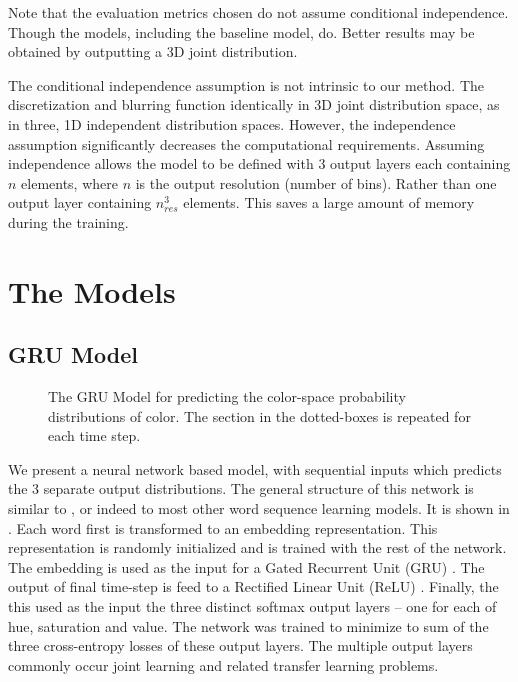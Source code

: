 \documentclass[11pt,letterpaper]{article}
\newcommand{\parencite}{\cite}
\newcommand{\textcite}{\newcite}
\begin{document}
Note that the evaluation metrics chosen do not assume conditional independence.
Though the models, including the baseline model, do.
Better results may be obtained by outputting a 3D joint distribution.

The conditional independence assumption is not intrinsic to our method.
The discretization and blurring function identically in 3D joint distribution space,
as in three, 1D independent distribution spaces.
However, the independence assumption significantly decreases the computational requirements.
Assuming independence allows the model to be defined with 3 output layers each containing $n$ elements, where $n$ is the output resolution (number of bins).
Rather than one output layer containing $n_{res}^3$ elements.
This saves a large amount of memory during the training.


\section{The Models}

\subsection{GRU Model}

\begin{figure}
	\resizebox{\columnwidth}{!}{}

	\caption{\label{network}
		The GRU Model for predicting the color-space probability distributions of color.
		The section in the dotted-boxes is repeated for each time step.
		}
\end{figure}

We present a neural network based model, with sequential inputs which predicts the 3 separate output distributions. The general structure of this network is similar to \textcite{2016arXiv160603821M}, or indeed to most other word sequence learning models.
It is shown in .
Each word first is transformed to an embedding representation.
This representation is randomly initialized and is trained with the rest of the network.
The embedding is used as the input for a Gated Recurrent Unit (GRU)  \parencite{cho2014properties,chung2014empirical}.
The output of final time-step is feed to a Rectified Linear Unit (ReLU)  \parencite{dahl2013reludropout}.
Finally, the this used as the input the three distinct softmax output layers -- one for each of hue, saturation and value.
The network was trained to minimize to sum of the three cross-entropy losses of these output layers.
The multiple output layers commonly occur joint learning and related transfer learning problems.
\end{document}
